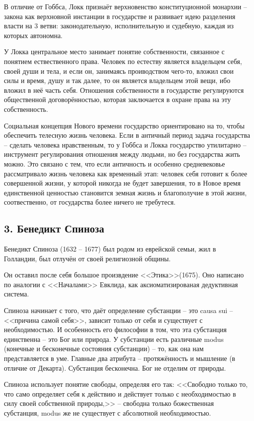 \documentclass[a4paper, 12pt]{book} %
\begin{document}
В отличие от Гоббса, Локк признаёт верхновенство конституционной монархии -- закона как верхновной инстанции в государстве и развивает идею разделения власти на 3 ветви: законодательную, исполнительную и судебную, каждая из которых автономна.

У Локка центральное место занимает понятие собственности, связанное с понятием ествественного права. Человек по естеству является владельцем себя, своей души и тела, и если он, занимаясь проиводством чего-то, вложил свои силы и время, душу и так далее, то он является владельцем этой вещи, ибо вложил в неё часть себя. Отношения собственности в государстве регулируются общественной договорённостью, которая заключается в охране права на эту собственность.

Социальная концепция Нового времени государство ориентировано на то, чтобы обеспечить телесную жизнь человека. Если в античный период задача государства -- сделать человека нравственным, то у Гоббса и Локка государство утилитарно -- инструмент регулирования отношения между людьми, но без государства жить можно.	Это связано с тем, что если античность и особенно средневековье рассматривало жизнь человека как временный этап: человек себя готовит к более совершенной жизни, у которой никогда не будет завершения, то в Новое время единственной ценностью становится земная жизнь и благополучие в этой жизни, соотвественно, от государства более ничего не требутеся.

\subsection*{3. Бенедикт Спиноза}
Бенедикт Спиноза (1632 --  1677) был родом из еврейской семьи, жил в Голландии, был отлучён от своей религиозной общины.

Он оставил после себя большое произвдение <<Этика>>(1675). Оно написано по аналогии с <<Началами>> Евклида, как аксиоматизированая дедуктивная система. 

Спиноза начинает с того, что даёт определение субстанции -- это causa sui -- <<причина самой себя>>, зависит только от себя и существует с необходимостью. И особенность его философии в том, что эта субстанция единственна -- это Бог или природа. У субстанции есть различные modus (конечные и бесконечные состояния субстанции) -- то, как она нам представляется в уме. Главные два атрибута -- протяжённость и мышление (в отличие от Декарта). Субстанция бесконечна. Бог не отделим от природы. 

Спиноза использует понятие свободы, определяя его так: <<Свободно только то, что само определяет себя к действию и действует только с необходимостью в силу своей собственной природы,>> -- свободна только божественная субстанция, modus же не существует с абсолютной необходимостью. 
\end{document}
